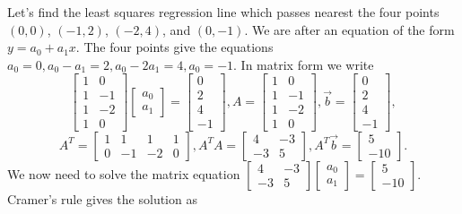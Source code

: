 \begin{example}
Let's find the least squares regression line which passes nearest the four points $(0,0)$, $(-1,2)$, $(-2,4)$, and $(0,-1)$. We are after an equation of the form $y=a_0+a_1x$.  The four points give the equations $a_0=0, a_0-a_1=2, a_0-2a_1=4, a_0=-1$. In matrix form we write 
$$
\begin{bmatrix}
1&0\\
1&-1\\
1&-2\\
1&0
\end{bmatrix}
\begin{bmatrix}
a_0\\
a_1
\end{bmatrix}
=
\begin{bmatrix}
0\\
2\\
4\\
-1
\end{bmatrix}
,
A=
\begin{bmatrix}
1&0\\
1&-1\\
1&-2\\
1&0
\end{bmatrix}, 
\vec b = 
\begin{bmatrix}
0\\
2\\
4\\
-1
\end{bmatrix}, 
$$
$$
A^T=
\begin{bmatrix}
1&1&1&1\\
0&-1&-2&0
\end{bmatrix}, 
A^TA = 
\begin{bmatrix}
4&-3\\
-3&5
\end{bmatrix}, 
A^T\vec b =
\begin{bmatrix}
5\\
-10
\end{bmatrix}. 
$$
We now need to solve the matrix equation 
$
\begin{bmatrix}
4&-3\\
-3&5
\end{bmatrix}\begin{bmatrix}
a_0\\
a_1
\end{bmatrix}
=
\begin{bmatrix}
5\\
-10
\end{bmatrix}. 
$
Cramer's rule gives the solution as

\end{example}
